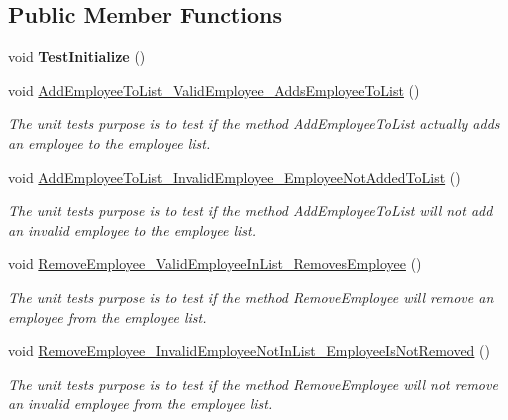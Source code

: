 \subsection*{Public Member Functions}
\begin{DoxyCompactItemize}
\item 
\hypertarget{class_the_company_1_1_tests_1_1_other_tests_a59add250f95b895297223af2c80c3c7f}{}void {\bfseries Test\+Initialize} ()\label{class_the_company_1_1_tests_1_1_other_tests_a59add250f95b895297223af2c80c3c7f}

\item 
void \hyperlink{class_the_company_1_1_tests_1_1_other_tests_a99113d3b2e96f8888b5f50a1819697e4}{Add\+Employee\+To\+List\+\_\+\+Valid\+Employee\+\_\+\+Adds\+Employee\+To\+List} ()
\begin{DoxyCompactList}\small\item\em The unit test\textquotesingle{}s purpose is to test if the method Add\+Employee\+To\+List actually adds an employee to the employee list. \end{DoxyCompactList}\item 
void \hyperlink{class_the_company_1_1_tests_1_1_other_tests_a833581f7d183dcc53d7c6cfe09ccc61e}{Add\+Employee\+To\+List\+\_\+\+Invalid\+Employee\+\_\+\+Employee\+Not\+Added\+To\+List} ()
\begin{DoxyCompactList}\small\item\em The unit test\textquotesingle{}s purpose is to test if the method Add\+Employee\+To\+List will not add an invalid employee to the employee list. \end{DoxyCompactList}\item 
void \hyperlink{class_the_company_1_1_tests_1_1_other_tests_ae86fadae6c291598b1a9e0b86cbbb735}{Remove\+Employee\+\_\+\+Valid\+Employee\+In\+List\+\_\+\+Removes\+Employee} ()
\begin{DoxyCompactList}\small\item\em The unit test\textquotesingle{}s purpose is to test if the method Remove\+Employee will remove an employee from the employee list. \end{DoxyCompactList}\item 
void \hyperlink{class_the_company_1_1_tests_1_1_other_tests_a1dbd7071338871b986591e32b6a697af}{Remove\+Employee\+\_\+\+Invalid\+Employee\+Not\+In\+List\+\_\+\+Employee\+Is\+Not\+Removed} ()
\begin{DoxyCompactList}\small\item\em The unit test\textquotesingle{}s purpose is to test if the method Remove\+Employee will not remove an invalid employee from the employee list. \end{DoxyCompactList}\item 

\end{DoxyCompactItemize}
